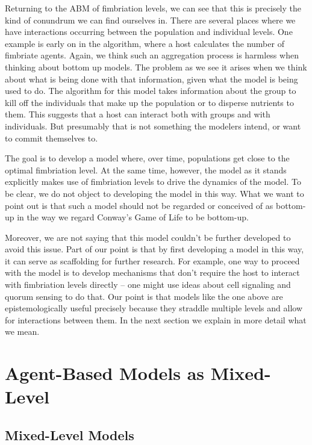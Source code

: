 \documentclass[11pt]{article}
\begin{document}
Returning to the ABM of fimbriation levels, we can see that this is precisely the kind of conundrum we can find ourselves in. There are several places where we have interactions occurring between the population and individual levels. One example is early on in the algorithm, where a host calculates the number of fimbriate agents. Again, we think such an aggregation process is harmless when thinking about bottom up models. The problem as we see it arises when we think about what is being  done with that information, given what the model is being used to do.  The algorithm for this model takes information about the group to kill off the individuals that make up the population or to disperse nutrients to them. This suggests that a host can interact both with groups and with individuals.  But presumably that is not something the modelers intend, or want to commit themselves to.

The goal is to develop a model where, over time, populations get close to the optimal fimbriation level.  At the same time, however, the model as it stands explicitly makes use of fimbriation levels to drive the dynamics of the model.  To be clear, we do not object to developing the model in this way. What we want to point out is that such a model should not be regarded or conceived of as bottom-up in the way we regard Conway's Game of Life to be bottom-up. 

Moreover, we are not saying that this model couldn't be further developed to avoid this issue.  Part of our point is that by first developing a model in this way, it can serve as scaffolding for further research. For example, one way to proceed with the model is to develop mechanisms that don't require the host to interact with fimbriation levels directly -- one might use ideas about cell signaling and quorum sensing to do that. Our point is that models like the one above are epistemologically useful precisely because they straddle multiple levels and allow for interactions between them. In the next section we explain in more detail what we mean.


\section{Agent-Based Models as Mixed-Level}


\subsection{Mixed-Level Models}
\end{document}
